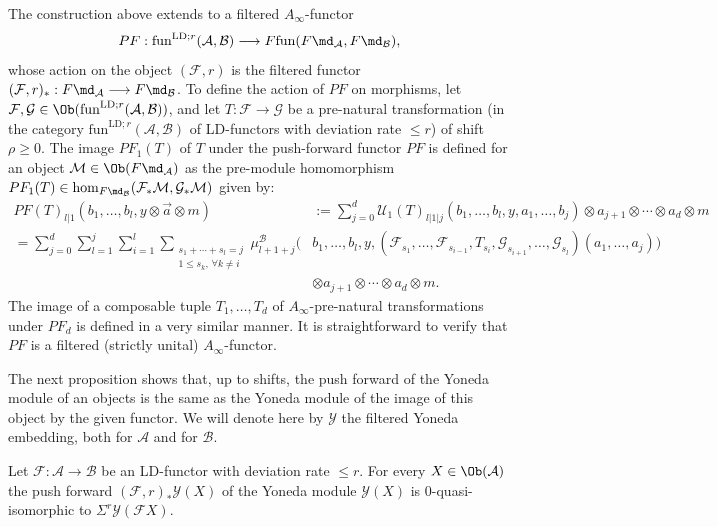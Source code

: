 The construction above extends to a filtered $A_{\infty}$-functor
$$PF: \text{fun}^{\text{LD};r}(\mathcal{A}, \mathcal{B})
\longrightarrow F\text{fun}(F\md_{\mathcal{A}}, F\md_{\mathcal{B}}),$$
whose action on the object $(\mathcal{F}, r)$ is the filtered
functor
$(\mathcal{F},r)_* :F\md_{\mathcal{A}} \longrightarrow
F\md_{\mathcal{B}}$. To define the action of $PF$ on morphisms, let
$\mathcal{F}, \mathcal{G} \in \Ob
(\text{fun}^{\text{LD};r}(\mathcal{A}, \mathcal{B}))$, and let
$T\colon \mathcal{F}\to \mathcal{G}$ be a pre-natural transformation
(in the category $\text{fun}^{\text{LD};r}(\mathcal{A}, \mathcal{B})$
of LD-functors with deviation rate $\leq r$) of shift $\rho \geq
0$. The image $PF_1(T)$ of $T$ under the push-forward functor $PF$ is
defined for an object $\mathcal{M} \in \Ob(F\md_{\mathcal{A}})$ as the
pre-module homomorphism
$PF_1(T) \in \hom_{F\md_{\mathcal{B}}}(\mathcal{F}_*\mathcal{M},
\mathcal{G}_*\mathcal{M})$ given by:
\begin{align*}
  PF(T)_{l|1}(b_1,\ldots, b_l, y\otimes \vec{a}\otimes m) & :=
  \sum_{j=0}^d \mathcal{U}_1(T)_{l|1|j}(b_1,\ldots, b_l,y,a_1,\ldots,
  b_j)\otimes a_{j+1}\otimes \cdots \otimes a_d\otimes m \\ =
  \sum_{j=0}^d \sum_{l=1}^j\sum_{i=1}^l\sum_{\substack{s_1 + \cdots +
      s_l = j \\ 1 \leq s_k, \, \forall k \neq i}}
  \mu^{\mathcal{B}}_{l+1+j}\bigl( & b_1,\ldots, b_l,y,(\mathcal{F}_{s_1},\ldots,
  \mathcal{F}_{s_{i-1}},T_{s_i},\mathcal{G}_{s_{i+1}}, \ldots,
  \mathcal{G}_{s_l})(a_1,\ldots, a_j)\bigr)  \\
  & \otimes a_{j+1}\otimes
  \cdots \otimes a_d\otimes m.
\end{align*}
The image of a composable tuple $T_1,\ldots, T_d$ of
$A_\infty$-pre-natural transformations under $PF_d$ is defined in a
very similar manner. It is straightforward to verify that $PF$ is a
filtered (strictly unital) $A_{\infty}$-functor.

The next proposition shows that, up to shifts, the push forward of the
Yoneda module of an objects is the same as the Yoneda module of the
image of this object by the given functor. We will denote here by
$\mathcal{Y}$ the filtered Yoneda embedding, both for $\mathcal{A}$
and for $\mathcal{B}$.
\begin{prop} \label{p:pushf-yon} Let
  $\mathcal{F}: \mathcal{A} \longrightarrow \mathcal{B}$ be an
  LD-functor with deviation rate $\leq r$. For every
  $X \in \Ob(\mathcal{A})$ the push forward
  $(\mathcal{F},r)_* \mathcal{Y}(X)$ of the Yoneda module
  $\mathcal{Y}(X)$ is $0$-quasi-isomorphic to
  $\Sigma^r \mathcal{Y}(\mathcal{F} X)$.
\end{prop}

